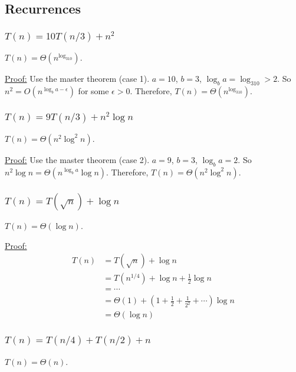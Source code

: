 \documentclass{article}
\begin{document}
\subsection{Recurrences}
\subsubsection{$T(n)=10T(n/3)+n^2$}
$T(n)=\Theta(n^{\log_310})$.

\noindent\underline{Proof:} Use the master theorem (case 1). $a=10$, $b=3$, $\log_ba=\log_310>2$. So $n^2=O(n^{\log_ba-\epsilon})$ for some $\epsilon>0$. Therefore, $T(n)=\Theta(n^{\log_310})$.

\subsubsection{$T(n)=9T(n/3)+n^2\log n$}
$T(n)=\Theta(n^2\log^2n)$.

\noindent\underline{Proof:} Use the master theorem (case 2). $a=9$, $b=3$, $\log_ba=2$. So $n^2\log n=\Theta(n^{\log_ba}\log n)$. Therefore, $T(n)=\Theta(n^2\log^2n)$.

\subsubsection{$T(n)=T(\sqrt{n})+\log n$}
$T(n)=\Theta(\log n)$.

\noindent\underline{Proof:}
\begin{align*}
T(n)&=T(\sqrt{n})+\log n\\
&=T(n^{1/4})+\log n+\frac{1}{2}\log n\\
&=\cdots\\
&=\Theta(1)+\left(1+\frac{1}{2}+\frac{1}{2^2}+\cdots\right)\log n\\
&=\Theta(\log n)
\end{align*}

\subsubsection{$T(n)=T(n/4)+T(n/2)+n$}
$T(n)=\Theta(n)$.
\end{document}

